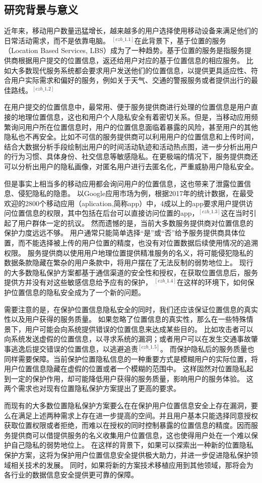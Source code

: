 \documentclass[zihao=-4]{ctexart}
\begin{document}
\subsection{研究背景与意义}
近年来，移动用户数量迅猛增长，越来越多的用户选择使用移动设备来满足他们的日常活动需求，而不是依靠电脑。
$^{[czh\_1.1]}$在此背景下，基于位置的服务（Location Based Services, LBS）成为了一种趋势。基于位置的服务是指服务提供商根据用户提交的位置信息，返还给用户对应的基于位置信息的相应服务。
比如大多数现代服务系统都会要求用户发送他们的位置信息，以提供更具适应性、符合用户实际需求和偏好的服务，例如关于天气、交通的警报服务或者提供出行的最佳路线。$^{[czh\_1.2]}$
\par
在用户提交的位置信息中，最常用、便于服务提供商进行处理的位置信息是用户直接的地理位置信息，这也和用户个人隐私安全有着密切关系。但是，当移动应用频繁询问用户所在位置信息时，用户的位置信息面临着暴露的风险，甚至用户的其他隐私也不再安全。比如不可信的服务提供商可以利用用户的位置信息和上传时间，结合大数据分析手段绘制出用户的时间活动轨迹和活动热点图，进一步分析出用户的行为习惯、具体身份、社交信息等敏感隐私。在更极端的情况下，服务提供商还可以分析出用户的隐私画像，对匿名用户进行去匿名化，严重威胁用户隐私安全。
\par
但是事实上相当多的移动应用都会询问用户的位置信息，这也带来了泄露位置信息、侵犯隐私的隐患。
以Google应用市场为例，根据2017年的统计数据，在最受欢迎的2800个移动应用（aplication,简称app）中，4成以上的app要求用户提供访问位置信息的权限，其中包括在后台可以直接访问位置的app，$^{[czh\_1.3]}$这在当时引起了用户群体一定的抗议。
然而遗憾的是，当前大多数服务提供商对位置信息的保护力度远远不够。
用户通常只能简单选择“是”或“否”给予服务提供商具体位置，而不能选择被上传的用户位置的精度，也没有对位置数据后续使用情况的追溯权限。
服务提供商以使用用户地理位置提供精准服务的名义，将可能侵犯隐私的数据条款隐藏在繁杂的用户条款中，将用户摆在了无法反制的弱势地位上。
现行的大多数隐私保护方案都基于通信渠道的安全性和授权，在获取位置信息后，服务提供方并没有对这些敏感信息给予应有的保护，
$^{[czh\_1.4]}$在这样的环境下，如何保护位置信息的隐私安全成为了一个新的问题。
\par
需要注意的是，在保护位置信息隐私安全的同时，我们还应该保证位置信息的真实性以及用户获得的服务质量。
如果忽略了位置信息的真实性，那么在一些特殊情景下，用户可能会向系统提供错误的位置信息来达成某些目的。
比如攻击者可以向系统发送虚假的位置信息，以寻求系统的漏洞；或者用户可以在发生交通事故肇事逃逸后提交错误的位置信息，以逃避追责$^{[czh\_1.5]}$。
而保护隐私后的服务质量也同样需要保障。当前保护位置隐私信息的一种重要方式是模糊用户的实际位置，将用户位置信息隐藏在虚假的位置或者一个模糊的范围中。
这样固然对位置隐私起到一定的保护作用，却可能降低用户获得的服务质量，影响用户的服务体验。
这两个需求也对现有位置隐私保护方案提出了更高的要求。
\par
而现有的大多数位置隐私保护方案要么在在保护用户位置信息安全上存在漏洞，要么在满足上述两种需求上存在进一步提高的空间。并且用户基本只能选择同意授权获取位置权限或者拒绝，而难以在授权的同时控制暴露的位置信息的精度。因而服务提供商可以借提供服务的名义收集用户位置信息，这也使得用户处在一个难以保护自己隐私的弱势地位上。
在这样的背景下，如果可以探索出一种新的位置隐私保护方案，这将为保护用户位置信息安全提供极大助力，并进一步促进隐私保护领域相关技术的发展。
同时，如果将新的方案技术移植应用到其他领域，那将会为各行业的数据信息安全提供更可靠的保障。
\end{document}
